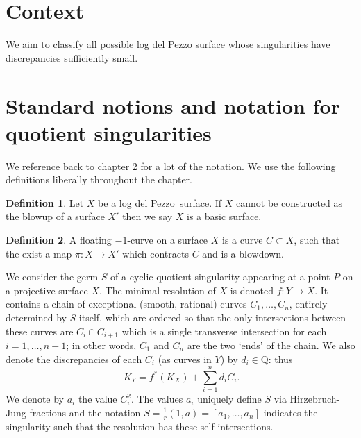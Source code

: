 \documentclass[12pt,a4paper]{book}      %
\newtheorem{thm}{Theorem}[section]
\theoremstyle{definition}
\newtheorem{dfn}[thm]{Definition}
\newcommand{\ldp}{log del Pezzo}
\newcommand{\Q}{\mathrm{Q}}
\begin{document}
\section{Context}
\begin{comment}
The main result of this chapter is 
\begin{thm}*\label{ThmOnSing}
Let $X$ be a non-smooth \ldp\ with only singularities of small discrepancy. Then 
\begin{enumerate}
\item\label{thm38i}
$X$ has either one singularity or two singularities, and if there are two each of them are of type $\frac{1}p(1,1)$ for some, possibly different,~$p$.
\item\label{thm38ii}
If $X$ admits no floating $-1$-curves then $X$ admits a toric degeneration. %
\end{enumerate}
\end{thm}
and how we birationally classify the resulting surfaces.
\end{comment}
We aim to classify all possible log del Pezzo surface whose singularities have discrepancies sufficiently small. 

\section{Standard notions and notation for quotient singularities}
We reference back to chapter 2 for a lot of the notation. We use the following definitions liberally throughout the chapter.
\begin{dfn}
Let $X$ be a \ldp\ surface. If $X$ cannot be constructed as the blowup of a surface $X'$ then we say $X$ is a basic surface.

\end{dfn}

\begin{dfn}
A floating $-1$-curve on a surface $X$ is a curve $C \subset X$, such that the exist a map $\pi \colon X \rightarrow X'$ which contracts $C$ and is a blowdown.
\end{dfn}

We consider the germ $S$ of a cyclic quotient singularity appearing at a point $P$ on a 
projective surface $X$.
The minimal resolution of $X$ is denoted $f\colon Y \longrightarrow X$. It contains a chain of
exceptional (smooth, rational)
curves $C_1,\dots,C_n$, entirely determined by $S$ itself, which are ordered so
that the only intersections between these curves are
$C_i\cap C_{i+1}$ which is a single transverse intersection for each $i=1,\dots,n-1$; 
in other words,
$C_1$ and $C_n$ are the two `ends' of the chain.
We also denote the discrepancies of each $C_i$ (as curves in $Y$) by $d_i\in\Q$: thus
\[\
K_Y = f^*(K_X) + \sum_{i=1}^n d_i C_i.
\]
We denote by $a_i$ the value $C_i^2$. The values $a_i$ uniquely define $S$ via Hirzebruch-Jung fractions \cite{Reid-cyclic} and the notation $S=\frac{1}{r}(1, a) = [a_1, \dots , a_n]$ indicates the singularity such that the resolution has these self intersections.
\label{sec!notation}
\end{document}
